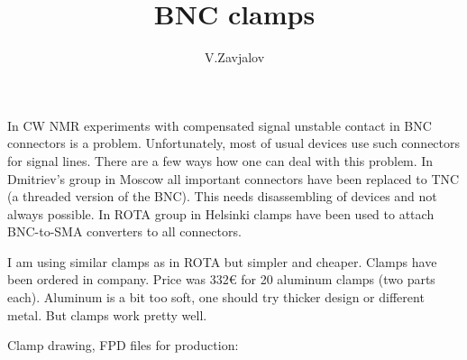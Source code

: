 \documentclass[a4paper]{article}
\title{BNC clamps}
\author{V.Zavjalov}
\begin{document}
\maketitle

In CW NMR experiments with compensated signal unstable contact in BNC
connectors is a problem. Unfortunately, most of usual devices use such
connectors for signal lines. There are a few ways how one can deal with
this problem. In Dmitriev's group in Moscow all important connectors have
been replaced to TNC (a threaded version of the BNC). This needs
disassembling of devices and not always possible. In ROTA group in
Helsinki clamps have been used to attach BNC-to-SMA converters to all
connectors.


I am using similar clamps as in ROTA but simpler and cheaper. Clamps have
been ordered in \SchaefferAG{} company. Price was 332\euro{} for 20
aluminum clamps (two parts each). Aluminum is a bit too soft, one should
try thicker design or different metal. But clamps work pretty well.

\noindent Clamp drawing, FPD files for production:\\
\end{document}
